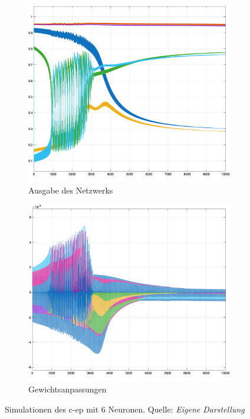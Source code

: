 \begin{figure}[h]
  \centering
  \begin{subfigure}[b]{0.5\textwidth}
    \includegraphics[width=\textwidth]{abbildungen/c_ep_sim_3_ausgabe.png}
    \caption{Ausgabe des Netzwerks}
  \end{subfigure}%
  \hfill
  \begin{subfigure}[b]{0.5\textwidth}
    \includegraphics[width=\textwidth]{abbildungen/c_ep_sim_3_weight_update.png}
    \caption{Gewichtsanpassungen}
  \end{subfigure}
  \caption{Simulationen des \ac{c-ep} mit 6 Neuronen. Quelle: \textit{Eigene Darstellung}}
  \label{fig:C-EP Sim 3}
\end{figure}
